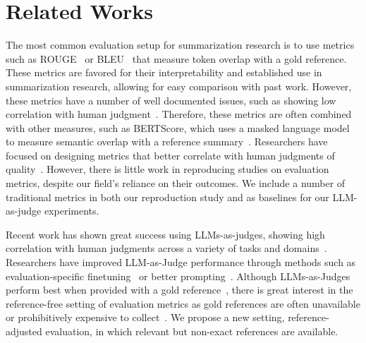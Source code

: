 \section{Related Works}
\label{sec:related-work}

The most common evaluation setup for summarization research is to use metrics such as ROUGE~\cite{lin2004rouge} or BLEU~\cite{papineni2002bleu} that measure token overlap with a gold reference. These metrics are favored for their interpretability and established use in summarization research, allowing for easy comparison with past work. However, these metrics have a number of well documented issues, such as showing low correlation with human judgment~\cite{liu2008correlation,fabbri2021summeval}. Therefore, these metrics are often combined with other measures, such as BERTScore, which uses a masked language model to measure semantic overlap with a reference summary~\cite{zhang2020bertscore}. Researchers have focused on designing metrics that better correlate with human judgments of quality~\cite{zhang2020bertscore,fabbri2021summeval}. However, there is little work in reproducing studies on evaluation metrics, despite our field's reliance on their outcomes. We include a number of traditional metrics in both our reproduction study and as baselines for our LLM-as-judge experiments. 

 Recent work has shown great success using LLMs-as-judges, showing high correlation with human judgments across a variety of tasks and domains~\cite{zheng2023judging}. Researchers have improved LLM-as-Judge performance through methods such as evaluation-specific finetuning~\cite{kim2023prometheus} or better prompting~\cite{liu2023geval}. Although LLMs-as-Judges perform best when provided with a gold reference~\cite{Deutsch2022LimitationsReferenceFree}, there is great interest in the reference-free setting of evaluation metrics as gold references are often unavailable or prohibitively expensive to collect~\cite{liu2023geval,vasilyev2020blanc}. We propose a new setting, reference-adjusted evaluation, in which relevant but non-exact references are available.